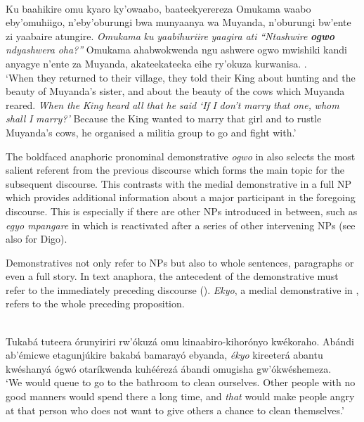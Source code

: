 \documentclass[output=paper 		  ]{langscibook}
\begin{document}
\eanoraggedright\sloppy%
    \label{ex:asiimwe:53}\citet[208]{Asiimwe2014}\\
    Ku baahikire omu kyaro ky’owaabo, baateekyerereza Omukama waabo eby’omuhiigo, n’eby’oburungi bwa munyaanya wa Muyanda, n’oburungi bw’ente zi yaabaire atungire. \emph{Omukama} \emph{ku} \emph{yaabihuriire} \emph{yaagira} \emph{ati} \emph{“Ntashwire} \textit{\textbf{ogwo}} \emph{ndyashwera} \emph{oha?”} Omukama ahabwokwenda ngu ashwere ogwo mwishiki kandi anyagye n’ente za Muyanda, akateekateeka eihe ry’okuza kurwanisa. \hfill \citep[21]{Karwemera1975}.\\
  ‘When they returned to their village, they told their King about hunting and the beauty of Muyanda’s sister, and about the beauty of the cows which Muyanda reared. \emph{When} \emph{the} \emph{King} \emph{heard} \emph{all} \emph{that} \emph{he} \emph{said} \emph{‘If} \emph{I} \emph{don’t} \emph{marry} \emph{that} \emph{one,} \emph{whom} \emph{shall} \emph{I} \emph{marry?’} Because the King wanted to marry that girl and to rustle Muyanda's cows, he organised a militia group to go and fight with.'
  \z

The boldfaced anaphoric pronominal demonstrative \textit{ogwo} in  also selects the most salient referent from the previous discourse which forms the main topic for the subsequent discourse. This contrasts with the medial demonstrative in a full NP which provides additional information about a major participant in the foregoing discourse. This is especially if there are other NPs introduced in between, such as \textit{egyo mpangare} in  which is reactivated after a series of other intervening NPs (see also \citealt{Nicolle2014} for Digo).

Demonstratives not only refer to NPs but also to whole sentences, paragraphs or even a full story. In text anaphora, the antecedent of the demonstrative must refer to the immediately preceding discourse (\citealt[224]{Himmelmann1996}). \textit{Ekyo}, a medial demonstrative in , refers to the whole preceding proposition.

\eanoraggedright\sloppy%
    \label{ex:asiimwe:54}\citet[209]{Asiimwe2014}\\
    Tukabá tuteera órunyiriri rw’ókuzá omu kinaabiro-kihorónyo kwékoraho. Abándi ab’émicwe etagunjúkire bakabá bamarayó ebyanda, \emph{ékyo} kireeterá abantu kwéshanyá ógwó otaríkwenda kuhéérezá ábandi omugisha gw’ókwéshemeza. \hfill \citep[3]{Mugumya2010}\\
  `We would queue to go to the bathroom to clean ourselves. Other people with no good manners would spend there a long time, and \textit{that} would make people angry at that person who does not want to give others a chance to clean themselves.’
  \z
\end{document}
